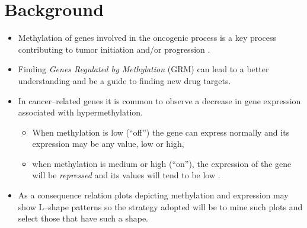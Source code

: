 
\section{Background}

\begin{itemize}
\item Methylation %
of genes involved in the oncogenic process is a key process contributing to tumor initiation and/or progression \cite{sadikovic:2008}. 

\item Finding \textit{Genes Regulated by Methylation} (GRM) can lead to a better understanding and be a guide to finding new drug targets.


\item In cancer--related genes it is common to observe a decrease in gene expression associated with hypermethylation.
\begin{itemize}
	\item  When methylation is low (``off'') the gene can express normally and
	its expression may be any value, low or high, 
	\item when methylation is medium or high (``on''), the expression of the gene will be \emph{repressed} and its values will tend to be low .
\end{itemize}
\item As a consequence relation plots depicting 
methylation and expression may show L--shape patterns so the
strategy adopted will be to mine such plots and select those that
have such a shape.

\end{itemize}

